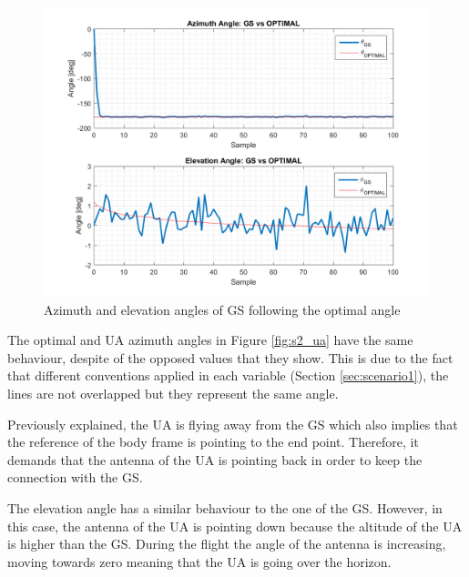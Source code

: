 \begin{figure}[H]
	\centering
	\includegraphics[scale=0.8]{figures/s2_gs.png}
	\caption{Azimuth and elevation angles of GS following the optimal angle}
	\label{fig:s2_gs}
\end{figure}

The optimal and UA azimuth angles in Figure \ref{fig:s2_ua} have the same behaviour, despite of the opposed values that they show. This is due to the fact that different conventions applied in each variable (Section \ref{sec:scenario1}), the lines are not overlapped but they represent the same angle.

Previously explained, the UA is flying away from the GS which also implies that the reference of the body frame is pointing to the end point. Therefore, it demands that the antenna of the UA is pointing back in order to keep the connection with the GS. 

The elevation angle has a similar behaviour to the one of the GS. However, in this case, the antenna of the UA is pointing down because the altitude of the UA is higher than the GS. During the flight the angle of the antenna is increasing, moving towards zero meaning that the UA is going over the horizon.


